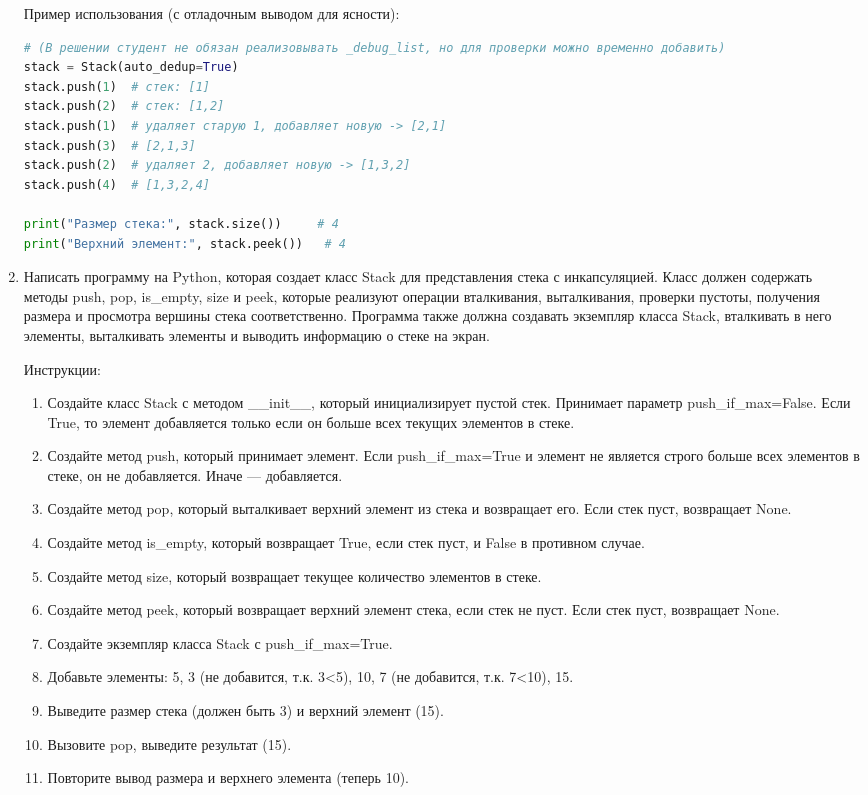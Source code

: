 \begin{enumerate}
Пример использования (с отладочным выводом для ясности):
\begin{lstlisting}[language=Python]
# (В решении студент не обязан реализовывать _debug_list, но для проверки можно временно добавить)
stack = Stack(auto_dedup=True)
stack.push(1)  # стек: [1]
stack.push(2)  # стек: [1,2]
stack.push(1)  # удаляет старую 1, добавляет новую -> [2,1]
stack.push(3)  # [2,1,3]
stack.push(2)  # удаляет 2, добавляет новую -> [1,3,2]
stack.push(4)  # [1,3,2,4]

print("Размер стека:", stack.size())     # 4
print("Верхний элемент:", stack.peek())   # 4
\end{lstlisting}

\item Написать программу на Python, которая создает класс Stack для представления стека с инкапсуляцией. Класс должен содержать методы push, pop, is\_empty, size и peek, которые реализуют операции вталкивания, выталкивания, проверки пустоты, получения размера и просмотра вершины стека соответственно. Программа также должна создавать экземпляр класса Stack, вталкивать в него элементы, выталкивать элементы и выводить информацию о стеке на экран.

Инструкции:
\begin{enumerate}
    \item Создайте класс Stack с методом \_\_init\_\_, который инициализирует пустой стек. Принимает параметр push\_if\_max=False. Если True, то элемент добавляется только если он больше всех текущих элементов в стеке.
    \item Создайте метод push, который принимает элемент. Если push\_if\_max=True и элемент не является строго больше всех элементов в стеке, он не добавляется. Иначе — добавляется.
    \item Создайте метод pop, который выталкивает верхний элемент из стека и возвращает его. Если стек пуст, возвращает None.
    \item Создайте метод is\_empty, который возвращает True, если стек пуст, и False в противном случае.
    \item Создайте метод size, который возвращает текущее количество элементов в стеке.
    \item Создайте метод peek, который возвращает верхний элемент стека, если стек не пуст. Если стек пуст, возвращает None.
    \item Создайте экземпляр класса Stack с push\_if\_max=True.
    \item Добавьте элементы: 5, 3 (не добавится, т.к. 3<5), 10, 7 (не добавится, т.к. 7<10), 15.
    \item Выведите размер стека (должен быть 3) и верхний элемент (15).
    \item Вызовите pop, выведите результат (15).
    \item Повторите вывод размера и верхнего элемента (теперь 10).
\end{enumerate}


\end{enumerate}
